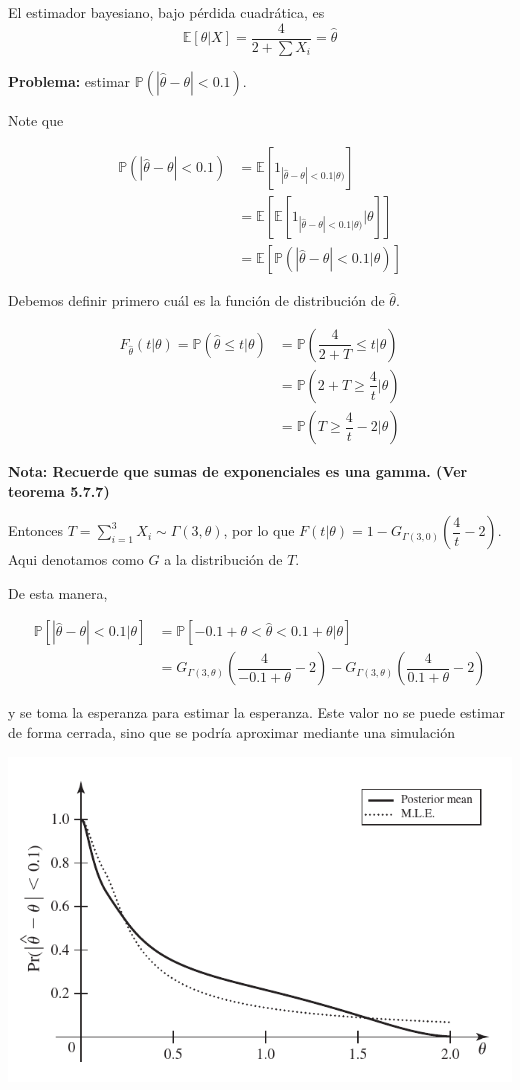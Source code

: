 \documentclass[
  12pt,
]{book}
\begin{document}
El estimador bayesiano, bajo pérdida cuadrática, es
\[
\mathbb E[\theta|X] = \dfrac 4{2+\sum X_i} = \hat\theta
\]

\textbf{Problema:} estimar \(\mathbb P(|\hat\theta-\theta|<0.1)\).

Note que

\begin{align*}
\mathbb P(|\hat\theta-\theta|<0.1)
&= \mathbb E [1_{|\hat\theta-\theta|<0.1|\theta)}] \\
&= \mathbb E[\mathbb E [1_{|\hat\theta-\theta|<0.1|\theta)}\vert \theta]] \\
&= \mathbb E[\mathbb P(|\hat\theta-\theta|<0.1|\theta)]
\end{align*}

Debemos definir primero cuál es la función de distribución de \(\hat{\theta}\).

\begin{align*}
F_{\hat{\theta}}(t|\theta) = \mathbb P(\hat\theta\leq t|\theta)&= \mathbb
P\left( \dfrac 4{2+T}\leq t\bigg|\theta\right) \\ & = \mathbb P\left( 2+T \geq
\dfrac 4t\bigg|\theta\right)\\ & = \mathbb P\left( T \geq \dfrac
4t-2\bigg|\theta\right)
\end{align*}

\textbf{Nota: Recuerde que sumas de exponenciales es una gamma. (Ver teorema 5.7.7)}

Entonces \(T=\sum_{i=1}^{3}X_{i}\sim \Gamma(3,\theta)\), por lo que \(F(t|\theta) = 1-G_{\Gamma(3,0)}\left( \dfrac 4t-2\right)\). Aqui denotamos como \(G\) a la
distribución de \(T\).

De esta manera,

\begin{align*}
\mathbb P[|\hat\theta-\theta|<0.1|\theta]  
& = \mathbb P [-0.1+\theta < \hat\theta < 0.1 +\theta|\theta]\\
& = G_{\Gamma(3,\theta)}\left(\dfrac 4{-0.1+\theta} - 2\right)-G_{\Gamma(3,\theta)}\left(\dfrac 4{0.1+\theta} - 2\right)
\end{align*}

y se toma la esperanza para estimar la esperanza. Este valor no se puede estimar
de forma cerrada, sino que se podría aproximar mediante una simulación

\includegraphics{./images/gamma_mle_vs_posterior.png}
\end{document}
